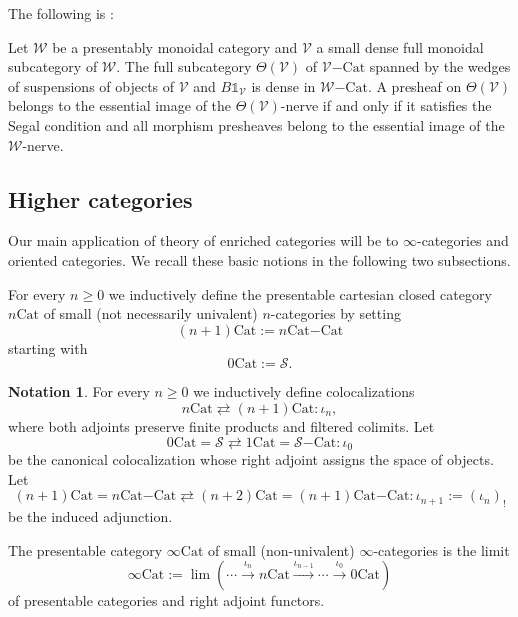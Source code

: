 \documentclass[10pt,oneside]{article}
\numberwithin{equation}{section} %
\numberwithin{figure}{section} %
\theoremstyle{plain}
\theoremstyle{definition}
\newtheorem{notation}[thm]{Notation}
\newcommand{\mS}{{\mathcal S}}
\newcommand{\mV}{{\mathcal V}}
\newcommand{\mW}{{\mathcal W}}
\newcommand{\n}{{n}}
\newcommand{\Cat}{\mathrm{Cat}}
\newcommand{\tu}{{\mathbb 1}}
\begin{document}
The following is \cite[Theorem 2.4.8]{GepnerHeine2026}:

\begin{theorem}\label{denseinherited} Let $\mW$ be a presentably monoidal category and $\mV$ a small dense full monoidal subcategory of $\mW$.
The full subcategory $\Theta(\mV)$ of $\mV\mathrm{-}\Cat$ spanned by the wedges of suspensions of objects of $\mV$ and $B\tu_\mV$ is dense in $\mW\mathrm{-}\Cat.$
A presheaf on $\Theta(\mV) $ belongs to the essential image of the $\Theta(\mV)$-nerve
if and only if it satisfies the Segal condition and 
all morphism presheaves belong to the essential image of the $\mW$-nerve.

\end{theorem}


\subsection{Higher categories}

Our main application of theory of enriched categories will be to $\infty$-categories and oriented categories.
We recall these basic notions in the following two subsections.

\begin{definition}
For every $\n \geq 0$ we inductively define the presentable cartesian closed category $\n\Cat$ of small (not necessarily univalent) $\n$-categories by setting
$$(\n+1)\Cat:= {{\n\Cat}\mathrm{-}\Cat} $$
starting with $$ 0\Cat :=\mS.$$
\end{definition}

\begin{notation}
For every $\n \geq 0$ we inductively define colocalizations
$$\n\Cat \rightleftarrows (\n+1)\Cat: \iota_\n,$$
where both adjoints  preserve finite products and filtered colimits.
Let
$$0\Cat= \mS \rightleftarrows 1\Cat = {\mS\mathrm{-}\Cat} : \iota_0 $$ be the canonical colocalization whose right adjoint assigns the space of objects. Let $$(\n+1)\Cat= {{\n\Cat}\mathrm{-}\Cat} \rightleftarrows (\n+2)\Cat= {{(\n+1)\Cat}\mathrm{-}\Cat}:\iota_{\n+1}:= (\iota_\n)_! $$
be the induced adjunction.	
	
\end{notation}

\begin{definition}The presentable category $\infty\Cat$ of small (non-univalent) $\infty$-categories is the limit
$$\infty\Cat:= \lim(\cdots\xrightarrow{\iota_{\n}} \n \Cat \xrightarrow{\iota_{\n-1}}\cdots \xrightarrow{\iota_0} 0 \Cat) $$
of presentable categories and right adjoint functors.

\end{definition}
\end{document}
